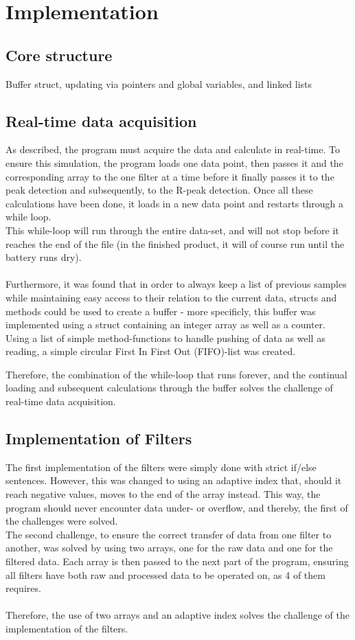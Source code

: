 \documentclass[12pt,a4paper]{article}
\begin{document}
\section{Implementation}
\subsection{Core structure}
Buffer struct, updating via pointers and global variables, and linked lists

\subsection{Real-time data acquisition}
	As described, the program must acquire the data and calculate in real-time. To ensure this simulation, the program loads one data point, then passes it and the corresponding array to the one filter at a time before it finally passes it to the peak detection and subsequently, to the R-peak detection. Once all these calculations have been done, it loads in a new data point and restarts through a while loop.\\
	This while-loop will run through the entire data-set, and will not stop before it reaches the end of the file (in the finished product, it will of course run until the battery runs dry).\\
	\\
	Furthermore, it was found that in order to always keep a list of previous samples while maintaining easy access to their relation to the current data, structs and methods could be used to create a buffer - more specificly, this buffer was implemented using a struct containing an integer array as well as a counter. Using a list of simple method-functions to handle pushing of data as well as reading, a simple circular First In First Out (FIFO)-list was created.
	
	Therefore, the combination of the while-loop that runs forever, and the continual loading and subsequent calculations through the buffer solves the challenge of real-time data acquisition.\\

\subsection{Implementation of Filters}
	The first implementation of the filters were simply done with strict if/else sentences. However, this was changed to using an adaptive index that, should it reach negative values, moves to the end of the array instead. This way, the program should never encounter data under- or overflow, and thereby, the first of the challenges were solved.\\
	The second challenge, to ensure the correct transfer of data from one filter to another, was solved by using two arrays, one for the raw data and one for the filtered data. Each array is then passed to the next part of the program, ensuring all filters have both raw and processed data to be operated on, as 4 of them requires.\\
	\\
	Therefore, the use of two arrays and an adaptive index solves the challenge of the implementation of the filters.\\
	
\end{document}
